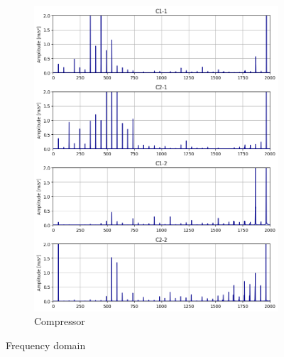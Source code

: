 \begin{figure}[h]
\begin{subfigure}[b]{0.32\textwidth}
        \includegraphics[width=\textwidth]{assets/results/eda/frequency-spectrum-compressors.png}
        \caption{Compressor}
    \end{subfigure} 
    \caption{Frequency domain}
\end{figure}





